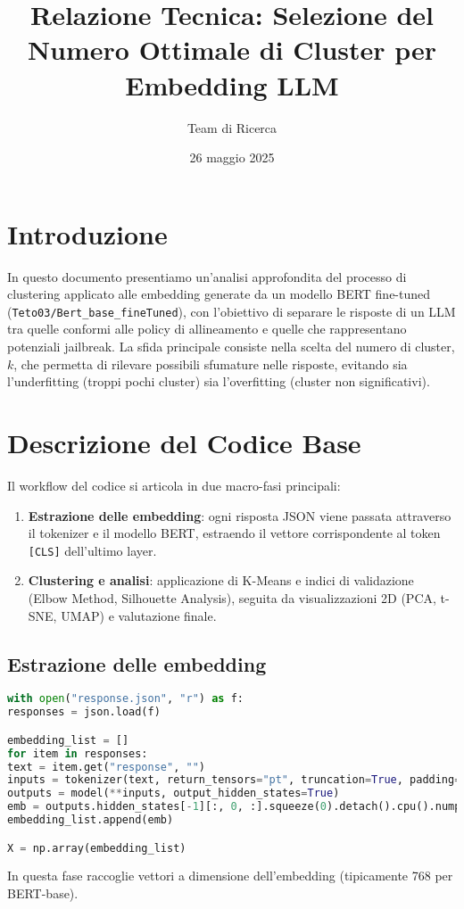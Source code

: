 \documentclass[a4paper,12pt]{article}
\title{Relazione Tecnica: Selezione del Numero Ottimale di Cluster per Embedding LLM}
\author{Team di Ricerca}
\date{26 maggio 2025}
\begin{document}
\maketitle
\tableofcontents
\newpage

\section{Introduzione}
In questo documento presentiamo un'analisi approfondita del processo di clustering applicato alle embedding generate da un modello BERT fine-tuned (\texttt{Teto03/Bert\_base\_fineTuned}), con l'obiettivo di separare le risposte di un LLM tra quelle conformi alle policy di allineamento e quelle che rappresentano potenziali jailbreak. La sfida principale consiste nella scelta del numero di cluster, $k$, che permetta di rilevare possibili sfumature nelle risposte, evitando sia l'underfitting (troppi pochi cluster) sia l'overfitting (cluster non significativi).

\section{Descrizione del Codice Base}
Il workflow del codice si articola in due macro-fasi principali:
\begin{enumerate}
\item \textbf{Estrazione delle embedding}: ogni risposta JSON viene passata attraverso il tokenizer e il modello BERT, estraendo il vettore corrispondente al token \texttt{[CLS]} dell'ultimo layer.
\item \textbf{Clustering e analisi}: applicazione di K-Means e indici di validazione (Elbow Method, Silhouette Analysis), seguita da visualizzazioni 2D (PCA, t-SNE, UMAP) e valutazione finale.
\end{enumerate}

\subsection{Estrazione delle embedding}
\begin{lstlisting}[language=Python,caption={Blocco di caricamento delle embedding}]
with open("response.json", "r") as f:
responses = json.load(f)

embedding_list = []
for item in responses:
text = item.get("response", "")
inputs = tokenizer(text, return_tensors="pt", truncation=True, padding=True)
outputs = model(**inputs, output_hidden_states=True)
emb = outputs.hidden_states[-1][:, 0, :].squeeze(0).detach().cpu().numpy()
embedding_list.append(emb)

X = np.array(embedding_list)
\end{lstlisting}
In questa fase  raccoglie  vettori a  dimensione dell'embedding (tipicamente 768 per BERT-base).
\end{document}
